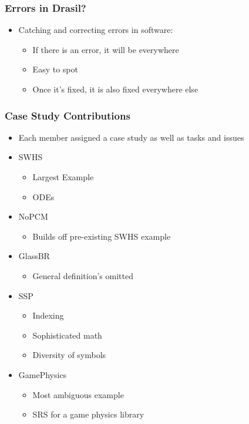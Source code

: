 \documentclass{beamer}
\begin{document}
\begin{frame}
\frametitle{Errors in Drasil?}
\begin{itemize}
 \item<1-> Catching and correcting errors in software:
  \begin{itemize}
   \item<2-> If there is an error, it will be everywhere
   \item<3-> Easy to spot
   \item<4-> Once it's fixed, it is also fixed everywhere else
  \end{itemize}
\end{itemize}
\end{frame}

\begin{frame}
\frametitle{Case Study Contributions}
\begin{itemize}
\item Each member assigned a case study as well as tasks and issues
\item<1-> SWHS
  \begin{itemize}
    \item Largest Example
    \item ODEs
  \end{itemize}
\item<2-> NoPCM
  \begin{itemize}
    \item Builds off pre-existing SWHS example
  \end{itemize}
\item<3-> GlassBR
  \begin{itemize}
    \item General definition's omitted
  \end{itemize}
\item<4-> SSP
  \begin{itemize}
    \item Indexing
    \item Sophisticated math
    \item Diversity of symbols
  \end{itemize}
\item<5-> GamePhysics
  \begin{itemize}
    \item Most ambiguous example
    \item SRS for a game physics library
  \end{itemize}
\end{itemize}
\end{frame}
\end{document}
